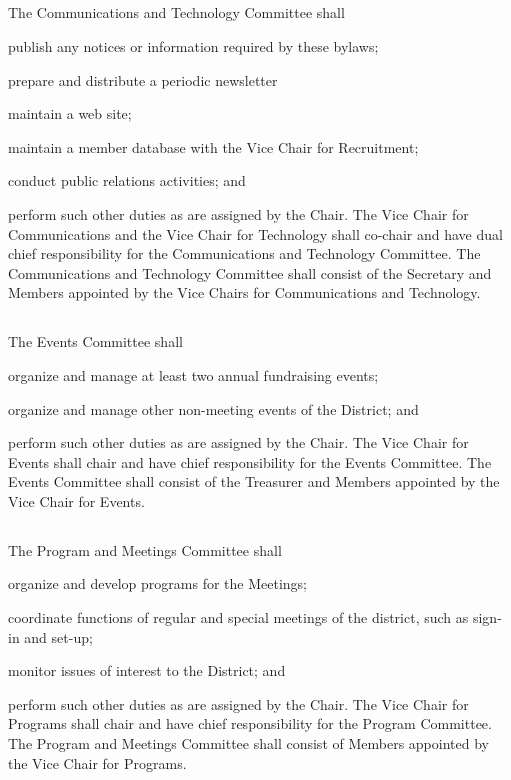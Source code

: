 \documentclass{article}
\newcommand{\fortythird}{\nth{43}}
\newcommand{\district}{\fortythird{} District}
\newcommand{\thedistrict}{the \district{}}
\begin{document}
\subsection{}
The Communications and Technology Committee shall
\begin{inlinealphalist}
    \item publish any notices or information required by these bylaws;
    \item prepare and distribute a periodic newsletter
    \item maintain a web site;
    \item maintain a member database with the Vice Chair for Recruitment;
    \item conduct public relations activities; and
    \item perform such other duties as are assigned by the Chair. The Vice Chair for Communications and the Vice Chair for Technology shall co-chair and have dual chief responsibility for the Communications and Technology Committee. The Communications and Technology Committee shall consist of the Secretary and Members appointed by the Vice Chairs for Communications and Technology.
\end{inlinealphalist}

\subsection{}
The Events Committee shall
\begin{inlinealphalist}
    \item organize and manage at least two annual fundraising events;
    \item organize and manage other non-meeting events of \thedistrict{}; and
    \item perform such other duties as are assigned by the Chair. The Vice Chair for Events shall chair and have chief responsibility for the Events Committee. The Events Committee shall consist of the Treasurer and Members appointed by the Vice Chair for Events.
\end{inlinealphalist}

\subsection{}
The Program and Meetings Committee shall
\begin{inlinealphalist}
    \item organize and develop programs for the Meetings;
    \item coordinate functions of regular and special meetings of the district, such as sign-in and set-up;
    \item monitor issues of interest to \thedistrict{}; and
    \item perform such other duties as are assigned by the Chair. The Vice Chair for Programs shall chair and have chief responsibility for the Program Committee. The Program and Meetings Committee shall consist of Members appointed by the Vice Chair for Programs.
\end{inlinealphalist}
\end{document}
